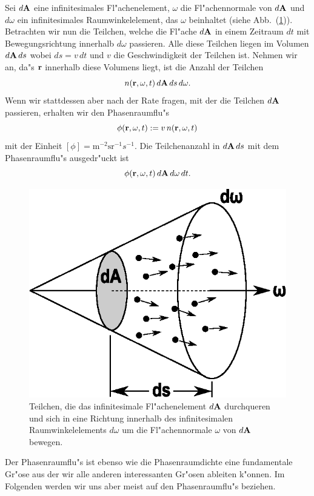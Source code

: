 	Sei $d\mathbf{A}$ eine infinitesimales Fl"achenelement, $\omega$ die Fl"achennormale von $d\mathbf{A}$ und $d\omega$ ein infinitesimales Raumwinkelelement, das $\omega$ beinhaltet (siehe Abb.~(\ref{fig:phasespacefluxsurface})). Betrachten wir nun die Teilchen, welche die Fl"ache $d\mathbf{A}$ in einem Zeitraum $dt$ mit Bewegungsrichtung innerhalb $d\omega$ passieren. Alle diese Teilchen liegen im Volumen $d\mathbf{A}\,ds$ wobei $ds=v\,dt$ und $v$ die Geschwindigkeit der Teilchen ist. Nehmen wir an, da"s $\mathbf{r}$ innerhalb diese Volumens liegt, ist die Anzahl der Teilchen $$n(\mathbf{r},\omega,t)\,d\mathbf{A}\,ds\,d\omega.$$ Wenn wir stattdessen aber nach der Rate fragen, mit der die Teilchen $d\mathbf{A}$ passieren, erhalten wir den Phasenraumflu"s $$\phi(\mathbf{r},\omega,t):=v\,n(\mathbf{r},\omega,t)$$ mit der Einheit $[\phi]=\text{m}^{-2}\text{sr}^{-1}s^{-1}$. Die Teilchenanzahl in $d\mathbf{A}\,ds$ mit dem Phasenraumflu"s ausgedr"uckt ist $$\phi(\mathbf{r},\omega,t)\,d\mathbf{A}\,d\omega\,dt.$$
	\begin{figure}
		\centering
		\includegraphics[height=0.3\textheight]{phasespacefluxsurface.eps}
		\caption{Teilchen, die das infinitesimale Fl"achenelement $d\mathbf{A}$ durchqueren und sich in eine Richtung innerhalb des infinitesimalen Raumwinkelelements $d\omega$ um die Fl"achennormale $\omega$ von $d\mathbf{A}$ bewegen.}
		\label{fig:phasespacefluxsurface}
	\end{figure}
	Der Phasenraumflu"s ist ebenso wie die Phasenraumdichte eine fundamentale Gr"ose aus der wir alle anderen interessanten Gr"osen ableiten k"onnen. Im Folgenden werden wir uns aber meist auf den Phasenraumflu"s beziehen.
		
